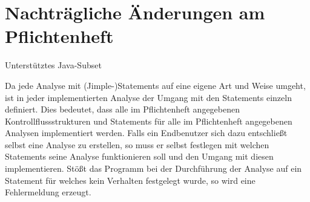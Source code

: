 \part{Nachträgliche Änderungen am Pflichtenheft}

\subparagraph{Unterstütztes Java-Subset}

Da jede Analyse mit (Jimple-)Statements auf eine eigene Art und Weise umgeht, ist in jeder implementierten Analyse der Umgang mit den Statements einzeln definiert.
Dies bedeutet, dass alle im Pflichtenheft angegebenen Kontrollflussstrukturen und Statements für alle im Pflichtenheft angegebenen Analysen implementiert werden.
Falls ein Endbenutzer sich dazu entschließt selbst eine Analyse zu erstellen, so muss er selbst festlegen mit welchen Statements seine Analyse funktionieren soll und den Umgang mit diesen implementieren.
Stößt das Programm bei der Durchführung der Analyse auf ein Statement für welches kein Verhalten festgelegt wurde, so wird eine Fehlermeldung erzeugt.
